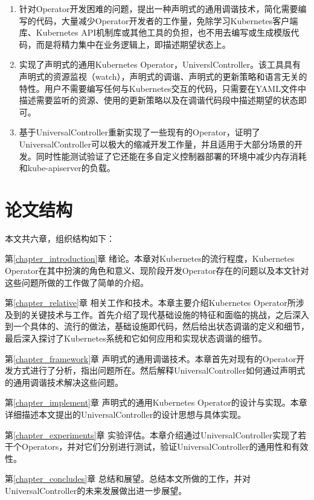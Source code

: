 \documentclass[macfonts,master]{njuthesis}
\begin{document}
\begin{enumerate}
	\item 针对Operator开发困难的问题，提出一种声明式的通用调谐技术，简化需要编写的代码，大量减少Operator开发者的工作量，免除学习Kubernetes客户端库、Kubernetes API机制库或其他工具的负担，也不用去编写或生成模版代码，而是将精力集中在业务逻辑上，即描述期望状态上。
	\item 实现了声明式的通用Kubernetes Operator，UniverslController。该工具具有声明式的资源监视（watch），声明式的调谐、声明式的更新策略和语言无关的特性。用户不需要编写任何与Kubernetes交互的代码，只需要在YAML文件中描述需要监听的资源、使用的更新策略以及在调谐代码段中描述期望的状态即可。
	\item 基于UniversalController重新实现了一些现有的Operator，证明了UniversalController可以极大的缩减开发工作量，并且适用于大部分场景的开发。同时性能测试验证了它还能在多自定义控制器部署的环境中减少内存消耗和kube-apiserver的负载。
\end{enumerate}


\section{论文结构}
本文共六章，组织结构如下：

第\ref{chapter_introduction}章 绪论。本章对Kubernetes的流行程度，Kubernetes Operator在其中扮演的角色和意义、现阶段开发Operator存在的问题以及本文针对这些问题所做的工作做了简单的介绍。

第\ref{chapter_relative}章 相关工作和技术。本章主要介绍Kubernetes Operator所涉及到的关键技术与工作。首先介绍了现代基础设施的特征和面临的挑战，之后深入到一个具体的、流行的做法，基础设施即代码，然后给出状态调谐的定义和细节，最后深入探讨了Kubernetes系统和它如何应用和实现状态调谐的细节。

第\ref{chapter_framework}章 声明式的通用调谐技术。本章首先对现有的Operator开发方式进行了分析，指出问题所在。然后解释UniversalController如何通过声明式的通用调谐技术解决这些问题。

第\ref{chapter_implement}章 声明式的通用Kubernetes Operator的设计与实现。本章详细描述本文提出的UniversalController的设计思想与具体实现。

第\ref{chapter_experiments}章 实验评估。本章介绍通过UniversalController实现了若干个Operators，并对它们分别进行测试，验证UniversalController的通用性和有效性。

第\ref{chapter_concludes}章 总结和展望。总结本文所做的工作，并对UniversalController的未来发展做出进一步展望。
\end{document}
